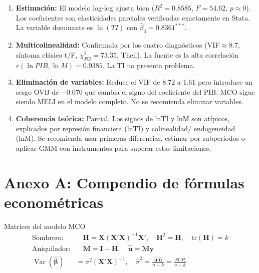 \documentclass[12pt,a4paper]{article}
\newcommand\bhat{\hat{\bm\beta}}
\newcommand\X{\mathbf{X}}
\newcommand\y{\mathbf{y}}
\newcommand\Xt{\mathbf{X}'}
\newcommand\Var{\operatorname{Var}}
\begin{document}
\begin{enumerate}
  \item \textbf{Estimación:} El modelo log-log ajusta bien
        ($R^2=0.8585$, $F=54.62$, $p\approx0$). Los coeficientes son elasticidades
        parciales verificadas exactamente en Stata. La variable dominante es
        $\ln(TI)$ con $\hat\beta_3=0.8361^{***}$.

  \item \textbf{Multicolinealidad:} Confirmada por los cuatro diagnósticos
        (VIF$\approx$8.7, síntoma clásico t/F, $\chi^2_{FG}=73.35$, Theil).
        La fuente es la alta correlación $r(\ln PIB,\ln M)=0.9385$. La TI
        no presenta problema.

  \item \textbf{Eliminación de variables:} Reduce el VIF de 8.72 a 1.61
        pero introduce un sesgo OVB de $-0.070$ que cambia el signo del
        coeficiente del PIB. MCO sigue siendo MELI en el modelo completo.
        No se recomienda eliminar variables.

  \item \textbf{Coherencia teórica:} Parcial. Los signos de lnTI y lnM son
        atípicos, explicados por represión financiera (lnTI) y colinealidad/
        endogeneidad (lnM). Se recomienda usar primeras diferencias,
        estimar por subperíodos o aplicar GMM con instrumentos para superar
        estas limitaciones.
\end{enumerate}

\appendix
\section{Anexo A: Compendio de fórmulas econométricas}

\begin{defbox}{Matrices del modelo MCO}
\begin{align*}
\text{Sombrero:}&\quad\mathbf{H}=\X(\Xt\X)^{-1}\Xt,\quad\mathbf{H}^2=\mathbf{H},\quad\text{tr}(\mathbf{H})=k\\
\text{Aniquilador:}&\quad\mathbf{M}=\mathbf{I}-\mathbf{H},\quad\hat{\bm u}=\mathbf{M}\y\\
\Var(\bhat)&=\sigma^2(\Xt\X)^{-1},\quad
\hat\sigma^2=\frac{\hat{\bm u}'\hat{\bm u}}{n-k}=\frac{SCR}{n-k}
\end{align*}
\end{defbox}
\end{document}

